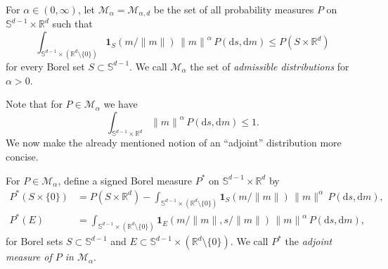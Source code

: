 \documentclass{aptpubarxiv}
\numberwithin{equation}{section}
\begin{document}
\begin{defn}
\label{def:admissible}
For $\alpha \in (0, \infty)$, let $\mathcal{M}_\alpha = \mathcal{M}_{\alpha,d}$ be the set of all probability measures $P$ on $\mathbb{S}^{d-1} \times {\mathbb{R}}^d$ such that
\begin{equation}
\label{eq:admissible}
  \int_{\mathbb{S}^{d-1}\times ({\mathbb{R}}^d \setminus \{ 0 \})} {\boldsymbol{1}}_S( m / {\|{m}\|} ) \, {\|{m}\|}^\alpha \, P({\mathrm{d}s}, {\mathrm{d}m}) \le P( S \times {\mathbb{R}}^d )
\end{equation}
for every Borel set $S \subset \mathbb{S}^{d-1}$. We call $\mathcal{M}_\alpha$ the set of \emph{admissible distributions} for $\alpha>0$. 
\end{defn}

Note that for $P \in \mathcal{M}_\alpha$ we have
\[
  \int_{\mathbb{S}^{d-1} \times {\mathbb{R}}^d} {\|{m}\|}^\alpha \, P({\mathrm{d}s}, {\mathrm{d}m}) \le 1.
\]
We now make the already mentioned notion of an ``adjoint'' distribution more concise. 

\begin{defn}
\label{def:adjoint}
For $P \in \mathcal{M}_\alpha$, define a signed Borel measure $P^*$ on $\mathbb{S}^{d-1} \times {\mathbb{R}}^d$ by
\begin{align}
\label{eq:adjoint:S0}
  P^*(S \times \{ 0 \}) &= P(S \times {\mathbb{R}}^d) - \int_{\mathbb{S}^{d-1} \times ({\mathbb{R}}^d \setminus \{ 0 \})} {\boldsymbol{1}}_S( m / {\|{m}\|} ) \, \|m\|^\alpha \, P({\mathrm{d}s}, {\mathrm{d}m}), \\
\label{eq:adjoint:E}
  P^*(E) &= \int_{ \mathbb{S}^{d-1} \times ({\mathbb{R}}^d \setminus \{ 0 \}) } {\boldsymbol{1}}_E( m / {\|{m}\|}, s / {\|{m}\|} ) \, {\|{m}\|}^\alpha \, P({\mathrm{d}s}, {\mathrm{d}m}),
\end{align}
for Borel sets $S \subset \mathbb{S}^{d-1}$ and $E \subset \mathbb{S}^{d-1} \times ({\mathbb{R}}^d \setminus \{ 0 \})$.
We call $P^*$ the \emph{adjoint measure of $P$ in $\mathcal{M}_\alpha$}.
\end{defn}
\end{document}
